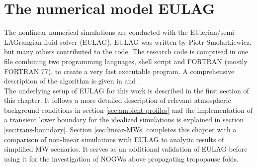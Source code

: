 \chapter{The numerical model EULAG}
\label{sec:EULAG}
The nonlinear numerical simulations are conducted with the EUlerian/semi- LAGrangian fluid solver (EULAG). EULAG was written by Piotr Smolarkiewicz, but many others contributed to the code. The research code is comprised in one file combining two programming languages, shell script and FORTRAN (mostly FORTRAN 77), to create a very fast executable program. A comprehensive description of the algorithm is given in \textcite[]{smolarkiewicz_forward--time_1997} and \textcite[]{smolarkiewicz_mpdata_1998}. \\
The underlying setup of EULAG for this work is described in the first section of this chapter. It follows a more detailed description of relevant atmospheric background conditions in section \ref{sec:ambient-profiles} and the implementation of a transient lower boundary for the idealized simulations is explained in section \ref{sec:trans-boundary}. Section \ref{sec:linear-MWs} completes this chapter with a comparison of non-linear simulations with EULAG to analytic results of simplified MW scenarios. It serves as an additional validation of EULAG before using it for the investigation of NOGWs above propagating tropopause folds.

